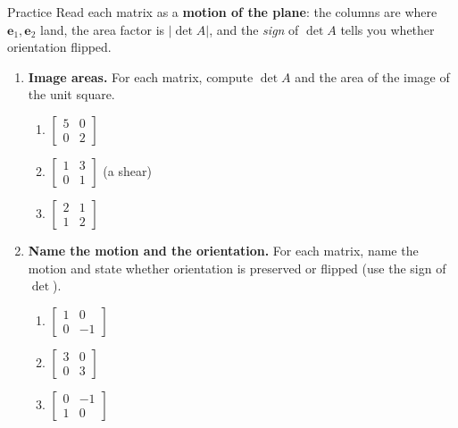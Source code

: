 \documentclass[10pt]{article}
\newcommand{\ee}{\mathbf{e}}
\begin{document}
\namedateperiod

\vspace{0.12in}

\begin{notesbox}{Practice}
Read each matrix as a \textbf{motion of the plane}: the columns are where $\ee_1,\ee_2$ land, the area
factor is $|\det A|$, and the \emph{sign} of $\det A$ tells you whether orientation flipped.

\begin{enumerate}[leftmargin=1.9em, itemsep=11pt]
  \item \textbf{Image areas.} For each matrix, compute $\det A$ and the area of the image of the unit square.
    \begin{enumerate}[label=(\alph*), leftmargin=1.8em, itemsep=5pt]
      \item $\begin{bmatrix} 5 & 0 \\ 0 & 2 \end{bmatrix}$ \hfill
      \item $\begin{bmatrix} 1 & 3 \\ 0 & 1 \end{bmatrix}$ \; {\footnotesize(a shear)} \hfill
      \item $\begin{bmatrix} 2 & 1 \\ 1 & 2 \end{bmatrix}$
    \end{enumerate}
    \vspace{1.2cm}
  \item \textbf{Name the motion and the orientation.} For each matrix, name the motion and state whether
        orientation is preserved or flipped (use the sign of $\det$).
    \begin{enumerate}[label=(\alph*), leftmargin=1.8em, itemsep=5pt]
      \item $\begin{bmatrix} 1 & 0 \\ 0 & -1 \end{bmatrix}$ \hfill \blank{3.5cm}
      \item $\begin{bmatrix} 3 & 0 \\ 0 & 3 \end{bmatrix}$ \hfill \blank{3.5cm}
      \item $\begin{bmatrix} 0 & -1 \\ 1 & 0 \end{bmatrix}$ \hfill \blank{3.5cm}

\end{enumerate}
\end{enumerate}
\end{notesbox}
\end{document}
